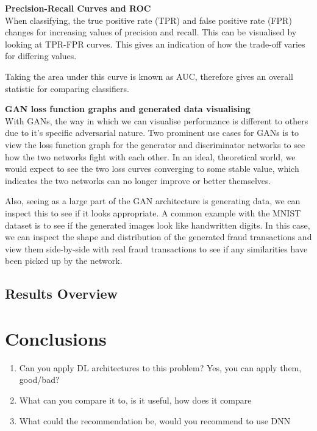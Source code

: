 \documentclass[12pt,a4paper,twoside]{report}
\begin{document}
\textbf{Precision-Recall Curves and ROC}\\
When classifying, the true positive rate (TPR) and false positive rate (FPR) changes for increasing values of precision and recall. This can be visualised by looking at TPR-FPR curves. This gives an indication of how the trade-off varies for differing values.

Taking the area under this curve is known as AUC, therefore gives an overall statistic for comparing classifiers. 

\textbf{GAN loss function graphs and generated data visualising}\\
With GANs, the way in which we can visualise performance is different to others due to it's specific adversarial nature. Two prominent use cases for GANs is to view the loss function graph for the generator and discriminator networks to see how the two networks fight with each other. In an ideal, theoretical world, we would expect to see the two loss curves converging to some stable value, which indicates the two networks can no longer improve or better themselves. 

Also, seeing as a large part of the GAN architecture is generating data, we can inspect this to see if it looks appropriate. A common example with the MNIST dataset is to see if the generated images look like handwritten digits. In this case, we can inspect the shape and distribution of the generated fraud transactions and view them side-by-side with real fraud transactions to see if any similarities have been picked up by the network.

\section{Results Overview}

\chapter{Conclusions}

\begin{enumerate}
\item Can you apply DL architectures to this problem? Yes, you can apply them, good/bad? 
\item What can you compare it to, is it useful, how does it
compare
\item What could the recommendation be, would you recommend to use DNN
\end{enumerate}


\newpage
{}



\end{document}
